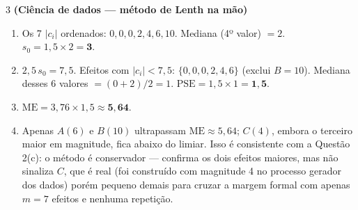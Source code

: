 \documentclass[11pt]{article}
\begin{document}
\begin{questao}{3} \textbf{(Ciência de dados --- método de Lenth na mão)}
\end{questao}
\begin{solucao}
\begin{enumerate}[label=(\alph*)]
  \item Os 7 $|c_i|$ ordenados: $0,0,0,2,4,6,10$. Mediana (4º valor) $=2$.
    $s_0 = 1{,}5\times2 = \mathbf{3}$.
  \item $2{,}5\,s_0 = 7{,}5$. Efeitos com $|c_i|<7{,}5$: $\{0,0,0,2,4,6\}$ (exclui $B=10$).
    Mediana desses 6 valores $=(0+2)/2=1$. $\text{PSE}=1{,}5\times1=\mathbf{1{,}5}$.
  \item $\text{ME} = 3{,}76 \times 1{,}5 \approx \mathbf{5{,}64}$.
  \item Apenas $A(6)$ e $B(10)$ ultrapassam $\text{ME}\approx5{,}64$; $C(4)$, embora o terceiro
    maior em magnitude, fica abaixo do limiar. Isso é consistente com a Questão 2(c): o método é
    conservador --- confirma os dois efeitos maiores, mas não sinaliza $C$, que é real (foi
    construído com magnitude 4 no processo gerador dos dados) porém pequeno demais para cruzar a
    margem formal com apenas $m=7$ efeitos e nenhuma repetição.
\end{enumerate}
\end{solucao}
\end{document}
